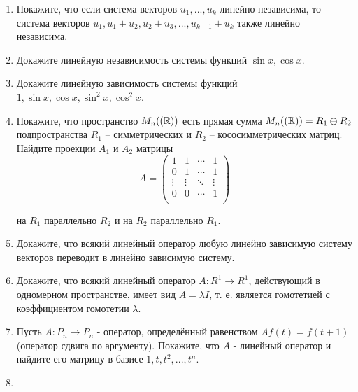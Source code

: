 



\begin{enumerate}

\item Покажите, что если система векторов $u_1, ..., u_k$ линейно независима, то система векторов $u_1, u_1+u_2, u_2+u_3, ..., u_{k-1}+u_k$ также линейно независима.

\item Докажите линейную независимость системы функций $\sin x, \cos x$.

\item Докажите линейную зависимость системы функций $1, \sin x, \cos x, \sin^2 x, \cos^2 x$.

\item Покажите, что пространство $M_n((\mathbb{R}))$ есть прямая сумма $M_n((\mathbb{R}))=R_1 \oplus R_2$ подпространства $R_1$ -- симметрических и $R_2$ -- кососимметрических матриц. Найдите проекции $A_1$ и $A_2$ матрицы
$$A=
\begin{pmatrix}
1 & 1 & \cdots & 1\\
0 & 1 & \cdots & 1\\
\vdots & \vdots & \ddots & \vdots\\
0 & 0 & \cdots & 1\\
\end{pmatrix}
$$

на $R_1$ параллельно $R_2$ и на $R_2$ параллельно $R_1$.

\item Докажите, что всякий линейный оператор любую линейно зависимую систему векторов переводит в линейно зависимую систему.

\item Докажите, что всякий линейный оператор $A:R^1 \to R^1$, действующий в одномерном пространстве, имеет вид $A=\lambda I$, т. е. является гомотетией с коэффициентом гомотетии $\lambda$.

\item Пусть $A:P_n \to P_n$ - оператор, определённый равенством $Af(t)=f(t+1)$ (оператор сдвига по аргументу). Покажите, что $A$ - линейный оператор и найдите его матрицу в базисе $1, t, t^2,...,t^n$.

\item 

\end{enumerate}


